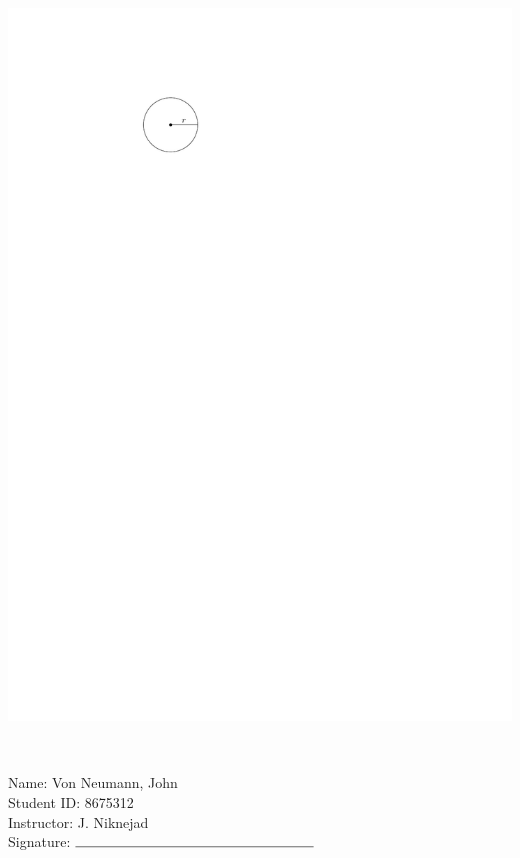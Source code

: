 \documentclass[12pt]{amsart}
\begin{document}
\begin{enumerate}
\includegraphics[scale = 0.8]{circle}

\vspace{1cm}
\newpage  $ $   \newpage\end{enumerate}\graphicspath{{/Users/jilan/Downloads/Randomizer/Randomizer/Sample Course/Sample Assessment/}}\setcounter{page}{1}


\thispagestyle{fancy}

 \noindent Name: Von Neumann, John \vspace{.3cm} \\\noindent Student ID: 8675312 \vspace{.3cm} \\\noindent Instructor: J. Niknejad \vspace{.3cm} \\\noindent Signature: $\rule{6cm}{0.15mm}$ \vspace{.3cm} \\ 
\end{document}
